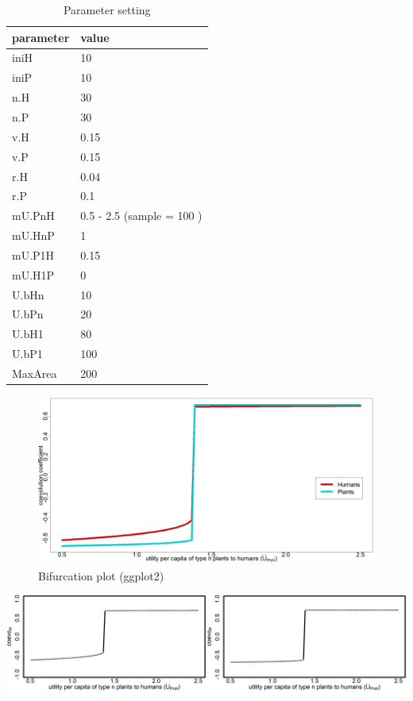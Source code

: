 \documentclass[]{book}
\begin{document}
\begin{table}[!h]

\caption{\label{tab:2mUPnHtablepdf}Parameter setting}
\centering
\begin{tabular}{l|l}
\hline
parameter & value\\
\hline
iniH & 10\\
\hline
iniP & 10\\
\hline
n.H & 30\\
\hline
n.P & 30\\
\hline
v.H & 0.15\\
\hline
v.P & 0.15\\
\hline
r.H & 0.04\\
\hline
r.P & 0.1\\
\hline
mU.PnH & 0.5 - 2.5 (sample = 100 )\\
\hline
mU.HnP & 1\\
\hline
mU.P1H & 0.15\\
\hline
mU.H1P & 0\\
\hline
U.bHn & 10\\
\hline
U.bPn & 20\\
\hline
U.bH1 & 80\\
\hline
U.bP1 & 100\\
\hline
MaxArea & 200\\
\hline
\end{tabular}
\end{table}

\begin{figure}
\includegraphics[width=1\linewidth]{plots/2_onePar-mU.PnH_ggbifplot} \caption{Bifurcation plot (ggplot2)}\label{fig:2mUPnHbifplot1print}
\end{figure}

\includegraphics[width=1\linewidth]{plots/2_onePar-mU.PnH_bifplot-pair}
\end{document}
